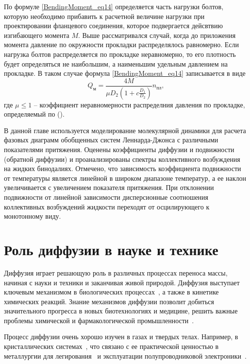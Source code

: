 По формуле \eqref{BendingMoment_eq14} определяется часть нагрузки болтов, которую необходимо прибавить к расчетной величине нагрузки при проектировании фланцевого соединения, которое подвергается дейсвтвию изгибающего момента $M$.
Выше рассматривался случай, когда до приложения момента давление по окружности прокладки распределялось равномерно.
Если нагрузка болтов распределяется по прокладке неравномерно, то его плотность будет определяться не наибольшим, а наименьшим удельным давлением на прокладке.
В таком случае формула \eqref{BendingMoment_eq14} записывается в виде
\begin{equation}
  \label{BendingMoment_eq15}
  Q_{\text{м}}=\frac{4M}{\mu D_2\left(1+c\frac{D_1}{D_2}\right)}n_{\text{пл}},
\end{equation}  
где $\mu \le 1$ -- коэффициент неравномерности распределния давления по прокладке, определяемый по ().






В данной главе используется моделирование молекулярной динамики для расчета фазовых диаграмм обобщенных систем Леннарда-Джонса с различными показателями притяжения.
Оценены коэффициенты диффузии и подвижности (обратной диффузии) и проанализированы спектры коллективного возбуждения на жидких бинодалиях. 
Отмечено, что зависимость коэффициента подвижности от температуры является линейной в широком диапазоне температур, а ее наклон увеличивается с увеличением показателя притяжения.
При отклонении подвижности от линейной зависимости дисперсионные соотношения коллективных возбуждений жидкости переходят от осцилирующего к монотонному виду.

\section{Роль диффузии в науке и технике}
\label{MACR-SecIntroduction}

Диффузия играет решающую роль в различных процессах переноса массы, начиная с науки и техники и заканчивая живой природой.
Диффузия выступает ключевым механизмом в биологических процессах~\cite{10.1016/j.bbagen.2013.09.037, 10.1038/s41598-018-22643-9}, а также в кинетике химических реакций.
Знание механизмов диффузии позволит добиться значительного прогресса в новых биотехнологиях и медицине, решить важные проблемы химической и фармакологической промышленности~\cite{10.1002/3527602836}.

Процесс диффузии очень хорошо изучен в газах и твердых телах.
Например, в кристаллических системах~\cite{10.1016/0079-6816(95)00039-2}, что связано с ее практической ценностью в металлургии для легирования~\cite{10.1016/s0924-0136(96)02826-9, 10.1016/j.actamat.2015.10.010, 10.1134/s1063783411110308} и эксплуатации полупроводниковой электроники~\cite{10.1103/physrevlett.84.4220, 10.1016/j.physrep.2009.10.003}.

